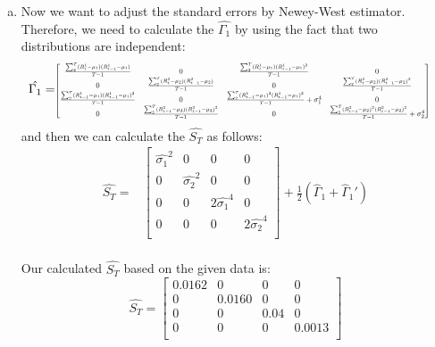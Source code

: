 \begin{enumerate}[(a)]
\item Now we want to adjust the standard errors by Newey-West estimator. Therefore, we need to calculate the $\hat{\Gamma_1}$ by using the fact that two distributions are independent:
\begin{equation*}
  \begin{aligned}
    \hat{\Gamma_1} = & \scalemath{0.6}{ \begin{bmatrix}
      \frac{\sum^T_2 (R_{t}^1-\mu_1)(R_{t-1}^1-\mu_1)}{T-1} &0&  \frac{\sum^T_2 (R_{t}^1-\mu_1)(R_{t-1}^1-\mu_1)^2}{T-1} &0\\
    0& \frac{\sum^T_2 (R_{t}^2-\mu_2)(R_{t-1}^2-\mu_2)}{T-1} &0 & \frac{\sum^T_2 (R_{t}^2-\mu_2)(R_{t-1}^2-\mu_2)^2}{T-1}\\
    \frac{\sum^T_2 (R_{t-1}^1-\mu_1)(R_{t-1}^1-\mu_1)^2}{T-1} &0 &\frac{\sum^T_2 (R_{t-1}^1-\mu_1)^2(R_{t-1}^1-\mu_1)^2}{T-1}+\sigma_1^4 &0\\
    0 & \frac{\sum^T_2 (R_{t-1}^2-\mu_2)(R_{t-1}^2-\mu_2)^2}{T-1} & 0 & \frac{\sum^T_2 (R_{t-1}^2-\mu_2)^2(R_{t-1}^2-\mu_2)^2}{T-1}+\sigma_2^4\\ 
    \end{bmatrix}} 
  \end{aligned}
\end{equation*}
and then we can calculate the $\hat{S_T}$ as follows:
\begin{equation*}
  \begin{aligned}
    \hat{S_T} = & \begin{bmatrix}
      \hat{\sigma_1}^2 & 0 & 0 &0 \\
      0 & \hat{\sigma_2}^2 &0 &0 \\
      0 & 0 & 2\hat{\sigma_1}^4 & 0 \\
      0 & 0 & 0 & 2\hat{\sigma_2}^4 \\
    \end{bmatrix}
    + \frac{1}{2}(\hat{\Gamma}_1 + \hat{\Gamma}_1')\\
  \end{aligned}
\end{equation*}

Our calculated $\hat{S_T}$ based on the given data is:
\begin{equation*}
  \hat{S_T} = \begin{bmatrix}
    0.0162 & 0 & 0 & 0\\
    0 & 0.0160 & 0 & 0\\
    0 & 0 & 0.04 & 0 \\
    0 & 0 & 0 & 0.0013 \\
  \end{bmatrix}
\end{equation*}


\end{enumerate}
